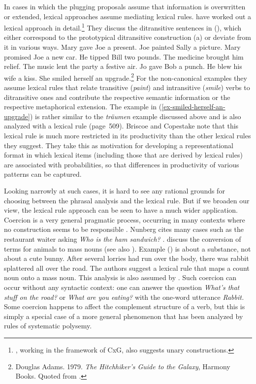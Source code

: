 In cases in which the plugging proposals assume that
information is overwritten or extended, lexical approaches assume mediating lexical
rules. \citet[Section~4]{BC99a} have worked out a lexical approach in detail.\footnote{%
\citet{Kay2005a}, working in the framework of CxG, also suggests unary constructions.}
They discuss the ditransitive sentences in (), which either correspond to the prototypical
ditransitive construction (a) or deviate from it in various ways.
\eal
\ex Mary gave Joe a present.
\ex\label{paint} Joe painted Sally a picture.
\ex Mary promised Joe a new car.
\ex He tipped Bill two pounds.
\ex The medicine brought him relief.
\ex The music lent the party a festive air.
\ex Jo gave Bob a punch.
\ex He blew his wife a kiss.
\ex\label{ex-smiled-herself-an-upgrade} She smiled herself an upgrade.\footnote{%
Douglas Adams. 1979. \emph{The Hitchhiker’s Guide to the Galaxy}, Harmony Books. Quoted from
.
}
\zl
For the non-canonical examples they assume lexical rules that relate transitive (\emph{paint}) and intransitive (\emph{smile}) 
verbs to ditransitive ones and contribute the respective semantic information or the respective
metaphorical extension. The example in (\ref{ex-smiled-herself-an-upgrade}) is rather similar to the
\emph{träumen} example discussed above and is also analyzed with a lexical rule (page~509). Briscoe
and Copestake note that this lexical rule is much more restricted in its productivity than the other lexical
rules they suggest. They take this as motivation for developing a representational
format in which lexical items (including those that are derived by lexical rules) are
associated with probabilities, so that differences in productivity of various patterns can be captured.

\largerpage
Looking narrowly at such cases, it is hard to see any rational grounds for choosing between the phrasal analysis and the lexical rule.  But if we broaden our view, the lexical rule approach can be seen to have a much wider application. 
Coercion is a very general pragmatic process, occurring in many contexts where no construction seems
to be responsible  \citep{Nunberg95a-u}.  Nunberg cites many cases such as the restaurant waiter
asking \emph{Who is the ham sandwich?} \citep[]{Nunberg95a-u}.  
\citet[]{CB92a} discuss the conversion of terms for animals to mass nouns (see also \citet[--43]{CB95a-u}). Example () is about a substance, not about a cute bunny.
\ea
After several lorries had run over the body, there was rabbit splattered all over the road.
\z
The authors suggest a lexical rule that maps a count noun onto a mass noun. This analysis is also
assumed by \citet[--115]{Fillmore99a}.
Such coercion can occur without any syntactic context: one can answer the question \emph{What's that
  stuff on the road?} or \emph{What are you eating?} with the one-word utterance \emph{Rabbit.}
Some coercion happens to affect the complement structure of a verb, but this is simply a special
case of a more general phenomenon that has been analyzed by rules of systematic polysemy.      

